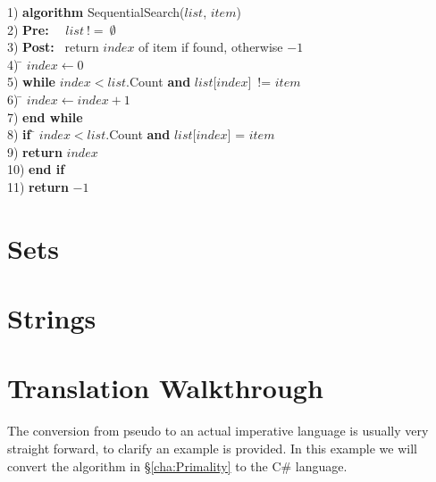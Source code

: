 \documentclass[10pt,oneside,a4paper]{report}
\begin{document}
\begin{tabbing}
1) \textbf{alg}\= \textbf{orithm} SequentialSearch($list$, $item$)\\
2) \> \textbf{Pre:}~~ $list~!=~\emptyset$ \\
3) \> \textbf{Post:}~ return $index$ of item if found, otherwise $-1$ \\
4) \> \= $index \leftarrow 0$ \\
5) \> \textbf{whi}\= \textbf{le} $index < list$.Count  \textbf{and} $list$[$index$]~!= $item$ \\
6) \> \> \= $index \leftarrow index+1$ \\
7) \> \textbf{end while} \\
8) \> \textbf{if }\= $ index < list$.Count  \textbf{and} $list$[$index$] = $item$ \\
9) \> \> \textbf{return} $index$ \\
10)\> \textbf{end if} \\
11)\> \textbf{return} $-1$ \\ 

\end{tabbing}


\chapter{Sets}

\chapter{Strings}

\appendix
\chapter{Translation Walkthrough}
The conversion from pseudo to an actual imperative language is usually very straight forward, to clarify an example is provided.
In this example we will convert the algorithm in \S\ref{cha:Primality} to the C\# language.
\end{document}
